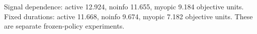 Signal dependence: active 12.924, noinfo 11.655, myopic 9.184 objective units. Fixed durations: active 11.668, noinfo 9.674, myopic 7.182 objective units. These are separate frozen-policy experiments.

